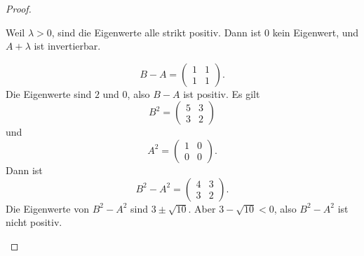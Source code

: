\begin{proof}
\begin{parts}
		Weil $\lambda>0$, sind die Eigenwerte alle strikt positiv. Dann ist $0$ kein Eigenwert, und $A +\lambda$ ist invertierbar.
\item 
	\[
		B-A=\begin{pmatrix} 1 & 1 \\ 1 & 1 \end{pmatrix} 
	.\] 
	Die Eigenwerte sind $2$ und $0$, also $B-A$ ist positiv. Es gilt
	\[
		B^2=\begin{pmatrix} 5 & 3 \\ 3 & 2 \end{pmatrix} 
	\]
	und
	\[
		A^2=\begin{pmatrix} 1 & 0 \\ 0 & 0 \end{pmatrix} 
	.\] 
	Dann ist
	\[
		B^2-A^2=\begin{pmatrix} 4 & 3 \\ 3 & 2 \end{pmatrix} 
	.\] 
	Die Eigenwerte von $B^2-A^2$ sind $3\pm \sqrt{10} $. Aber $3-\sqrt{10} <0$, also $B^2-A^2$ ist nicht positiv.
	\end{parts}
\end{proof}
